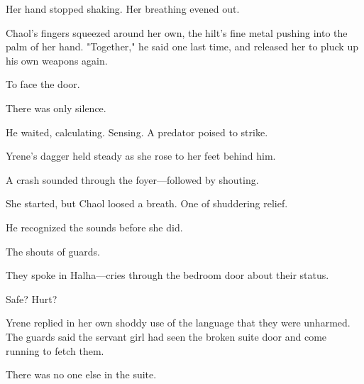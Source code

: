 Her hand stopped shaking.
Her breathing evened out.

Chaol's fingers squeezed around her own, the hilt's fine metal pushing into the palm of her hand.
"Together," he said one last time, and released her to pluck up his own weapons again.

To face the door.

There was only silence.

He waited, calculating.
Sensing.
A predator poised to strike.

Yrene's dagger held steady as she rose to her feet behind him.

A crash sounded through the foyer---followed by shouting.

She started, but Chaol loosed a breath.
One of shuddering relief.

He recognized the sounds before she did.

The shouts of guards.

They spoke in Halha---cries through the bedroom door about their status.

Safe?
Hurt?

Yrene replied in her own shoddy use of the language that they were unharmed.
The guards said the servant girl had seen the broken suite door and come running to fetch them.

There was no one else in the suite.

